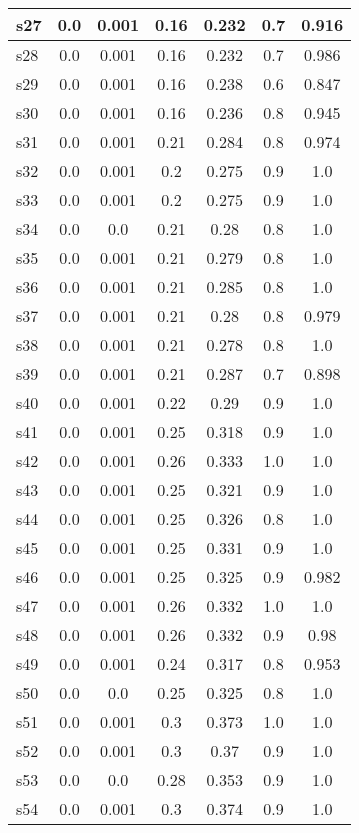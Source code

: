 \documentclass{article}
\begin{document}
\begin{tabular}{|l|c|c|c|c|c|c|}
\hline
s27 &0.0 & 0.001 & 0.16 & 0.232 & 0.7 & 0.916\\
\hline
s28 &0.0 & 0.001 & 0.16 & 0.232 & 0.7 & 0.986\\
\hline
s29 &0.0 & 0.001 & 0.16 & 0.238 & 0.6 & 0.847\\
\hline
s30 &0.0 & 0.001 & 0.16 & 0.236 & 0.8 & 0.945\\
\hline
s31 &0.0 & 0.001 & 0.21 & 0.284 & 0.8 & 0.974\\
\hline
s32 &0.0 & 0.001 & 0.2 & 0.275 & 0.9 & 1.0\\
\hline
s33 &0.0 & 0.001 & 0.2 & 0.275 & 0.9 & 1.0\\
\hline
s34 &0.0 & 0.0 & 0.21 & 0.28 & 0.8 & 1.0\\
\hline
s35 &0.0 & 0.001 & 0.21 & 0.279 & 0.8 & 1.0\\
\hline
s36 &0.0 & 0.001 & 0.21 & 0.285 & 0.8 & 1.0\\
\hline
s37 &0.0 & 0.001 & 0.21 & 0.28 & 0.8 & 0.979\\
\hline
s38 &0.0 & 0.001 & 0.21 & 0.278 & 0.8 & 1.0\\
\hline
s39 &0.0 & 0.001 & 0.21 & 0.287 & 0.7 & 0.898\\
\hline
s40 &0.0 & 0.001 & 0.22 & 0.29 & 0.9 & 1.0\\
\hline
s41 &0.0 & 0.001 & 0.25 & 0.318 & 0.9 & 1.0\\
\hline
s42 &0.0 & 0.001 & 0.26 & 0.333 & 1.0 & 1.0\\
\hline
s43 &0.0 & 0.001 & 0.25 & 0.321 & 0.9 & 1.0\\
\hline
s44 &0.0 & 0.001 & 0.25 & 0.326 & 0.8 & 1.0\\
\hline
s45 &0.0 & 0.001 & 0.25 & 0.331 & 0.9 & 1.0\\
\hline
s46 &0.0 & 0.001 & 0.25 & 0.325 & 0.9 & 0.982\\
\hline
s47 &0.0 & 0.001 & 0.26 & 0.332 & 1.0 & 1.0\\
\hline
s48 &0.0 & 0.001 & 0.26 & 0.332 & 0.9 & 0.98\\
\hline
s49 &0.0 & 0.001 & 0.24 & 0.317 & 0.8 & 0.953\\
\hline
s50 &0.0 & 0.0 & 0.25 & 0.325 & 0.8 & 1.0\\
\hline
s51 &0.0 & 0.001 & 0.3 & 0.373 & 1.0 & 1.0\\
\hline
s52 &0.0 & 0.001 & 0.3 & 0.37 & 0.9 & 1.0\\
\hline
s53 &0.0 & 0.0 & 0.28 & 0.353 & 0.9 & 1.0\\
\hline
s54 &0.0 & 0.001 & 0.3 & 0.374 & 0.9 & 1.0\\

\end{tabular}
\end{document}
